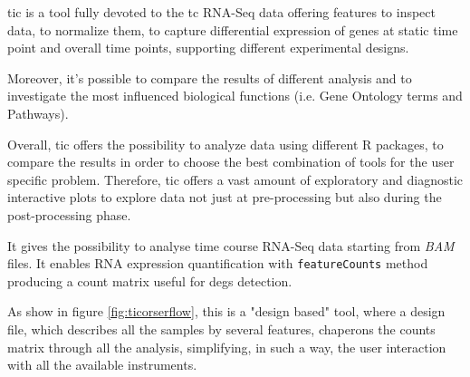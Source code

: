 \gls{tic} is a tool fully devoted to the \gls{tc} RNA-Seq data offering features to inspect data, to normalize them, to capture differential expression of genes at static time point and overall time points, supporting different experimental designs.

Moreover, it's possible to compare the results of different analysis and to investigate the most influenced biological functions (i.e. Gene Ontology terms and Pathways). 

Overall, \gls{tic} offers the possibility to analyze data using different R packages, to compare the results in order to choose the best combination of tools for the user specific problem. Therefore, \gls{tic} offers a vast amount of exploratory and diagnostic interactive plots to explore data not just at pre-processing but also during the post-processing phase. 


It gives the possibility to analyse time course RNA-Seq data starting from \textit{BAM} files.
It enables RNA expression quantification with \lstinline!featureCounts! method producing a count matrix useful for \glspl{deg} detection.

As show in figure \ref{fig:ticorserflow}, this is a "design based" tool, where a design file, which describes all the samples by several features, chaperons the counts matrix through all the analysis, simplifying, in such a way, the user interaction with all the available instruments.

